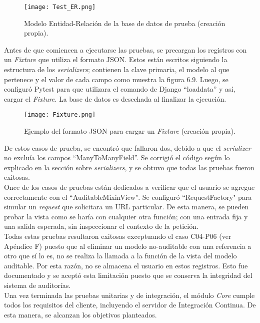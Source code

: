 \begin{figure}[h]
\centering
\texttt{[image: Test\_ER.png]}
\caption{Modelo Entidad-Relación de la base de datos de prueba (creación propia).}
\label{fig:figura6.8}
\end{figure}


Antes de que comiencen a ejecutarse las pruebas, se precargan los registros con un \textit{Fixture} que utiliza el formato JSON.  Estos están escritos siguiendo la estructura de los \textit{serializers}; contienen la clave primaria, el modelo al que pertenece y el valor de cada campo como muestra la figura 6.9. Luego, se configuró Pytest para que utilizara el comando de Django “loaddata” y así, cargar el \textit{Fixture}. La base de datos es desechada al finalizar la ejecución.

\begin{figure}[h]
\centering
\texttt{[image: Fixture.png]}
\caption{Ejemplo del formato JSON para cargar un \textit{Fixture} (creación propia).}
\label{fig:figura6.8}
\end{figure}

De estos casos de prueba, se encontró que fallaron dos, debido a que el \textit{serializer} no excluía los campos “ManyToManyField”. Se corrigió el código según lo explicado en la sección sobre \textit{serializers}, y se obtuvo que todas las pruebas fueron exitosas.\\

Once de los casos de pruebas están dedicados a verificar que el usuario se agregue correctamente con el “AuditableMixinView". Se configuró “RequestFactory" para simular un \textit{request} que solicitara un URL particular. De esta manera, se pueden probar la vista como se haría con cualquier otra función; con una entrada fija y una salida esperada, sin inspeccionar el contexto de la petición.\\

Todas estas pruebas resultaron exitosas exceptuando el caso C04-P06 (ver Apéndice F) puesto que al eliminar un modelo no-auditable con una referencia a otro que sí lo es, no se realiza la llamada a la función de la vista del modelo auditable. Por esta razón, no se almacena el usuario en estos registros. Esto fue documentado y se aceptó esta limitación puesto que se conserva la integridad del sistema de auditorías.\\

Una vez terminada las pruebas unitarias y de integración, el módulo \textit{Core} cumple todos los requisitos del cliente, incluyendo el servidor de Integración Continua. De esta manera, se alcanzan los objetivos planteados.

